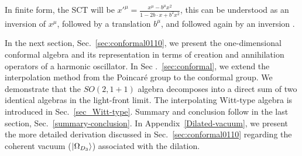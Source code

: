 \documentclass[%
 reprint,
superscriptaddress,
 amsmath,amssymb,
 aps,
]{revtex4-2}
\begin{document}
In finite form, the SCT will be $x'^{\mu }={\frac {x^{\mu }-b^{\mu }x^{2}}{1-2b\cdot x+b^{2}x^{2}}}$, this can be understood as an inversion of $x^\mu$, followed by a translation $b^\mu$, and followed again by an inversion \cite{Blumenhagen}.

In the next section, Sec.~\ref{sec:conformal0110}, we present the one-dimensional conformal algebra and its representation in terms of creation and annihilation operators of a harmonic oscillator. In Sec .~\ref{sec:conformal}, we extend the interpolation method from the Poincar\'e group to the conformal group. We demonstrate that the $SO(2, 1 + 1)$ algebra decomposes into a direct sum of two identical algebras in the light-front limit. The interpolating Witt-type algebra is introduced in Sec.~\ref{sec_Witt-type}. 
Summary and conclusion follow in the last section, Sec.~\ref{summary-conclusion}.
In Appendix~\ref{Dilated-vacuum}, 
we present the more detailed derivation discussed in Sec.~\ref{sec:conformal0110} regarding the coherent vacuum ($\ket{\Omega_{D_{3}}}$)
 associated with the dilation.
\end{document}
